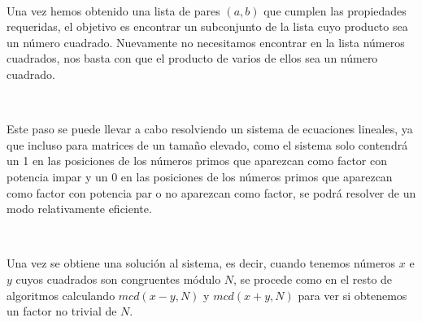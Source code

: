 \documentclass[11pt, conference]{IEEEtran}
\begin{document}
\

Una vez hemos obtenido una lista de pares $(a, b)$ que cumplen las propiedades requeridas, el objetivo es encontrar un subconjunto de la lista cuyo producto sea un número cuadrado. Nuevamente no necesitamos encontrar en la lista números cuadrados, nos basta con que el producto de varios de ellos sea un número cuadrado.

\

Este paso se puede llevar a cabo resolviendo un sistema de ecuaciones lineales, ya que incluso para matrices de un tamaño elevado, como el sistema solo contendrá un 1 en las posiciones de los números primos que aparezcan como factor con potencia impar y un 0 en las posiciones de los números primos que aparezcan como factor con potencia par o no aparezcan como factor, se podrá resolver de un modo relativamente eficiente.

\

Una vez se obtiene una solución al sistema, es decir, cuando tenemos números $x$ e $y$ cuyos cuadrados son congruentes módulo $N$, se procede como en el resto de algoritmos calculando $mcd(x - y, N )$ y $mcd(x + y, N )$ para ver si obtenemos un factor no trivial de $N$.

\
\end{document}
